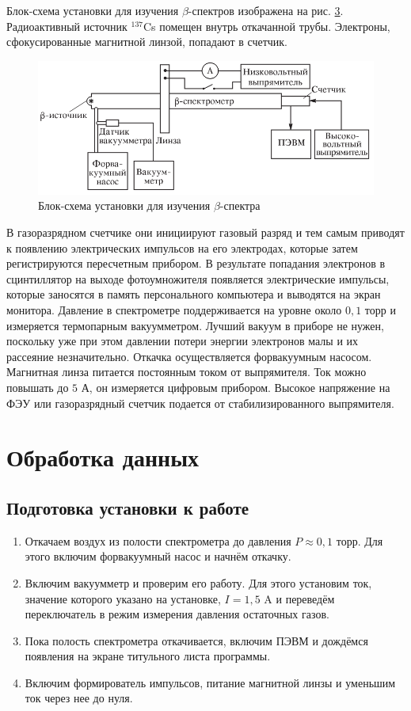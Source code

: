 \documentclass[a4paper,12pt]{article}
\begin{document}
Блок-схема установки для изучения $\beta$-спектров изображена на рис. \hyperref[fig: Exp setup]{3}. Радиоактивный источник ${}^{137}$Cs помещен внутрь откачанной трубы. Электроны, сфокусированные магнитной линзой, попадают в счетчик.
\begin{figure}[H]\label{fig: Exp setup}
    \centering
    \includegraphics[width = \textwidth]{Exp setup.png}
    \caption{Блок-схема установки для изучения $\beta$-спектра}
\end{figure}
В газоразрядном счетчике они инициируют газовый разряд и тем самым приводят к появлению электрических импульсов на его электродах, которые затем регистрируются пересчетным прибором. В результате попадания электронов в сцинтиллятор на выходе фотоумножителя появляется электрические импульсы, которые заносятся в память персонального компьютера и выводятся на экран монитора. Давление в спектрометре поддерживается на уровне около $0,1$ торр и измеряется термопарным вакуумметром. Лучший вакуум в приборе не нужен, поскольку уже при этом давлении потери энергии электронов малы и их рассеяние незначительно. Откачка осуществляется форвакуумным насосом. Магнитная линза питается постоянным током от выпрямителя. Ток можно повышать до $5$ А, он измеряется цифровым прибором. Высокое напряжение на ФЭУ или газоразрядный счетчик подается от стабилизированного выпрямителя.

\section{Обработка данных}

\subsection{Подготовка установки к работе}
\begin{enumerate}
    \item
    Откачаем воздух из полости спектрометра до давления $P \approx 0,1$ торр. Для этого включим форвакуумный насос и начнём откачку.
    \item 
    Включим вакуумметр и проверим его работу. Для этого установим ток, значение которого указано на установке, $I = 1,5$ A и переведём переключатель в режим измерения давления остаточных газов.
    \item 
    Пока полость спектрометра откачивается, включим ПЭВМ и дождёмся появления на экране титульного листа программы.
    \item 
    Включим формирователь импульсов, питание магнитной линзы и уменьшим ток через нее до нуля.
\end{enumerate}
\end{document}
